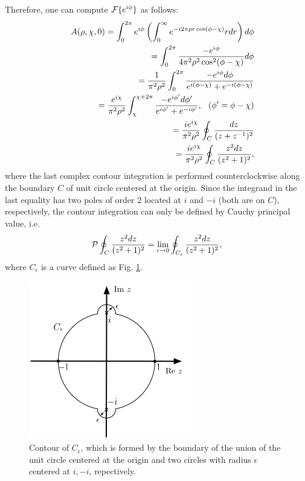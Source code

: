 Therefore, one can compute ${\cal F} \{e^{i\phi}\}$ as follows:
\begin{eqnarray}
	&&A(\rho, \chi, 0) = \int_{0}^{2\pi} e^{i\phi} 
	\left(\int_{0}^{\infty} e^{-i2\pi \rho r \cos(\phi - \chi)} r dr\right) d\phi
	\nonumber\\
	&&\hspace{0.5in}= \int_{0}^{2\pi} \frac{-e^{i\phi}}{4 \pi^2 \rho^2 \cos^2(\phi - \chi)} d\phi
	\nonumber\\
	&&\hspace{0.5in}= \frac{1}{\pi^2 \rho^2} \int_{0}^{2\pi} \frac{-e^{i\phi} d\phi}{e^{i(\phi - \chi)} + e^{-i(\phi - \chi)}}
	\nonumber\\
	&&\hspace{0.5in}= \frac{ e^{i\chi} }{\pi^2 \rho^2} \int_{\chi}^{\chi + 2\pi}
	\frac{-e^{i\phi'} d\phi'}{e^{i\phi'} + e^{-i\phi'}},
	\hspace{0.1in} (\phi' = \phi - \chi)
	\nonumber\\
	&&\hspace{0.5in}= \frac{i e^{i \chi}}{\pi^2 \rho^2} \oint_C \frac{dz}{(z + z^{-1})^2}
	\nonumber\\
	&&\hspace{0.5in}= \frac{i e^{i \chi}}{\pi^2 \rho^2} \oint_C \frac{z^2 dz}{(z^2 + 1)^2},
\end{eqnarray}
where the last complex contour integration is performed counterclockwise along the boundary $C$ of unit circle centered at the origin. Since the integrand in the last equality has two poles of order $2$ located at $i$ and $-i$ (both are on $C$), respectively, the contour integration can only be defined by Cauchy principal value, i.e.
\begin{eqnarray}
	{\cal P} \oint_C \frac{z^2 dz}{(z^2 + 1)^2} = \lim_{\epsilon \rightarrow 0} \oint_{C_{\epsilon}} \frac{z^2 dz}{(z^2 + 1)^2},
	\label{eq:CPV}
\end{eqnarray}
where $C_{\epsilon}$ is a curve defined as Fig. \ref{fig:contour}.
\begin{figure}
		\centering
		\includegraphics[width = .4\textwidth]{contour.jpg}
		\caption{Contour of $C_{\epsilon}$, which is formed by the boundary of the union of the unit circle centered at the origin and two circles with radius $\epsilon$ centered at $i, -i$, repectively.}
		\label{fig:contour}
\end{figure}
